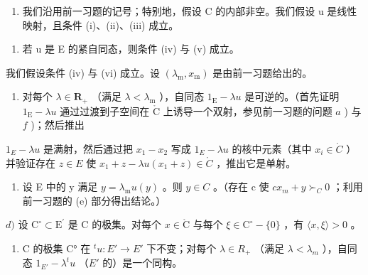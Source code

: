 \begin{enumerate}
\def\labelenumi{\arabic{enumi})}
\setcounter{enumi}{28}
\tightlist
\item
  我们沿用前一习题的记号；特别地，假设 C 的内部非空。我们假设 u 是线性映射，且条件 (i)、(ii)、(iii) 成立。
\end{enumerate}

\begin{enumerate}
\def\labelenumi{\alph{enumi})}
\tightlist
\item
  若 u 是 E 的紧自同态，则条件 (iv) 与 (v) 成立。
\end{enumerate}

我们假设条件 (iv) 与 (vi) 成立。设 \((\lambda_{\mathrm{m}}, x_{\mathrm{m}})\) 是由前一习题给出的。

\begin{enumerate}
\def\labelenumi{\alph{enumi})}
\setcounter{enumi}{1}
\tightlist
\item
  对每个 \(\lambda \in \mathbf{R}_{+}\) （满足 \(\lambda < \lambda_{\mathrm{m}}\) ），自同态 \(1_{\mathrm{E}} - \lambda u\) 是可逆的。（首先证明 \(1_{\mathrm{E}} - \lambda u\) 通过过渡到子空间在 \(\mathring{\mathrm{C}}\) 上诱导一个双射，参见前一习题的问题 \(a\) ) 与 \(f\) )；然后推出
\end{enumerate}

\(1_{E} - \lambda u\) 是满射，然后通过把 \(x_{1} - x_{2}\) 写成 \(1_{E} - \lambda u\) 的核中元素（其中 \(x_{i} \in \mathring{C}\) ）并验证存在 \(z \in E\) 使 \(x_{1} + z - \lambda u(x_{1} + z) \in \mathring{C}\) ，推出它是单射。

\begin{enumerate}
\def\labelenumi{\alph{enumi})}
\setcounter{enumi}{2}
\tightlist
\item
  设 E 中的 y 满足 \(y = \lambda_{\mathrm{m}} u(y)\) 。则 \(y \in C\) 。（存在 c 使 \(cx_{m} + y \succ_{C} 0\) ；利用前一习题的 (e) 部分得出结论。）
\end{enumerate}

\(d)\) 设 \(\mathrm{C}^{\circ}\subset\mathrm{E}^{\prime}\) 是 C 的极集。对每个 \(x\in\mathring{\mathrm{C}}\) 与每个 \(\xi\in\mathrm{C}^{\circ}-\{0\}\) ，有 \(\langle x,\xi\rangle>0\) 。

\begin{enumerate}
\def\labelenumi{\alph{enumi})}
\setcounter{enumi}{4}
\tightlist
\item
  C 的极集 C° 在 \(^{t}u\colon E'\to E'\) 下不变；对每个 \(\lambda\in R_{+}\) （满足 \(\lambda<\lambda_{m}\) ），自同态 \(1_{E'}-\lambda^{t}u\) （\(E'\) 的）是一个同构。
\end{enumerate}

